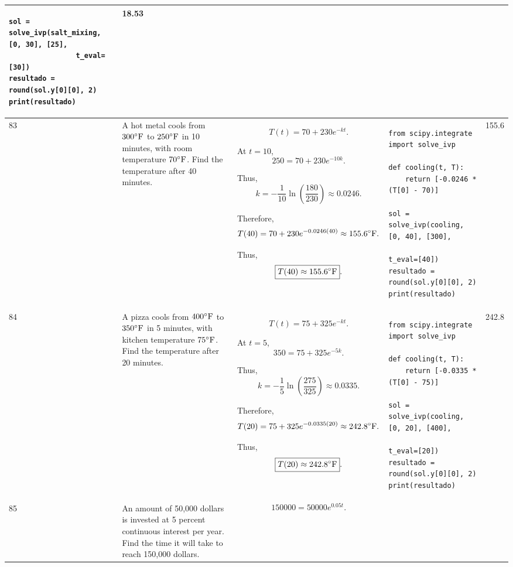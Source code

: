 \documentclass[a4paper,12pt]{article}
\begin{document}
\begin{longtable}{|p{0.3cm}|p{}|p{10cm}|p{}|p{1.5cm}|}
\begin{verbatim}
sol = solve_ivp(salt_mixing, [0, 30], [25],
                t_eval=[30])
resultado = round(sol.y[0][0], 2)
print(resultado)
\end{verbatim}
&
18.53 \\
\hline

83 &
A hot metal cools from $300^\circ{\rm F}$ to $250^\circ{\rm F}$ in 10 minutes, with room temperature $70^\circ{\rm F}$. Find the temperature after 40 minutes. &
\[
T(t)=70+230e^{-kt}.
\]

At $t=10$,
\[
250=70+230e^{-10k}.
\]

Thus,
\[
k=-\frac{1}{10}
\ln\left(\frac{180}{230}\right)
\approx0.0246.
\]

Therefore,
\[
T(40)
=70+230e^{-0.0246(40)}
\approx155.6^\circ{\rm F}.
\]

Thus,
\[
\boxed{T(40)\approx155.6^\circ{\rm F}}.
\]
&
\begin{verbatim}
from scipy.integrate import solve_ivp

def cooling(t, T):
    return [-0.0246 * (T[0] - 70)]

sol = solve_ivp(cooling, [0, 40], [300],
                t_eval=[40])
resultado = round(sol.y[0][0], 2)
print(resultado)
\end{verbatim}
&
155.6 \\
\hline

84 &
A pizza cools from $400^\circ{\rm F}$ to $350^\circ{\rm F}$ in 5 minutes, with kitchen temperature $75^\circ{\rm F}$. Find the temperature after 20 minutes. &
\[
T(t)=75+325e^{-kt}.
\]

At $t=5$,
\[
350=75+325e^{-5k}.
\]

Thus,
\[
k=-\frac{1}{5}
\ln\left(\frac{275}{325}\right)
\approx0.0335.
\]

Therefore,
\[
T(20)=75+325e^{-0.0335(20)}
\approx242.8^\circ{\rm F}.
\]

Thus,
\[
\boxed{T(20)\approx242.8^\circ{\rm F}}.
\]
&
\begin{verbatim}
from scipy.integrate import solve_ivp

def cooling(t, T):
    return [-0.0335 * (T[0] - 75)]

sol = solve_ivp(cooling, [0, 20], [400],
                t_eval=[20])
resultado = round(sol.y[0][0], 2)
print(resultado)
\end{verbatim}
&
242.8 \\
\hline

85 &
An amount of 50,000 dollars is invested at 5 percent continuous interest per year. Find the time it will take to reach 150,000 dollars. &
\[
150000=50000e^{0.05t}.
\]


\end{longtable}
\end{document}
